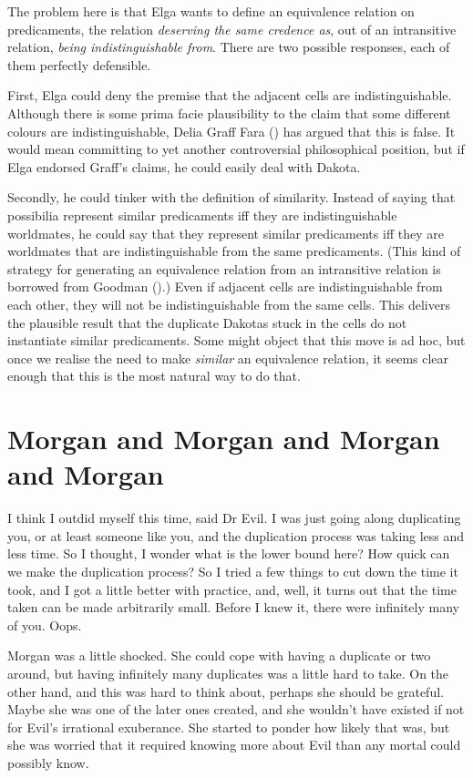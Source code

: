 \documentclass[
  11pt,
  letterpaper,
  DIV=11,
  numbers=noendperiod,
  oneside]{scrartcl}
\begin{document}
The problem here is that Elga wants to define an equivalence relation on
predicaments, the relation \emph{deserving the same credence as}, out of
an intransitive relation, \emph{being indistinguishable from}. There are
two possible responses, each of them perfectly defensible.

First, Elga could deny the premise that the adjacent cells are
indistinguishable. Although there is some prima facie plausibility to
the claim that some different colours are indistinguishable, Delia Graff
Fara () has argued that this is false. It
would mean committing to yet another controversial philosophical
position, but if Elga endorsed Graff's claims, he could easily deal with
Dakota.

Secondly, he could tinker with the definition of similarity. Instead of
saying that possibilia represent similar predicaments iff they are
indistinguishable worldmates, he could say that they represent similar
predicaments iff they are worldmates that are indistinguishable from the
same predicaments. (This kind of strategy for generating an equivalence
relation from an intransitive relation is borrowed from Goodman
().) Even if adjacent cells are
indistinguishable from each other, they will not be indistinguishable
from the same cells. This delivers the plausible result that the
duplicate Dakotas stuck in the cells do not instantiate similar
predicaments. Some might object that this move is ad hoc, but once we
realise the need to make \emph{similar} an equivalence relation, it
seems clear enough that this is the most natural way to do that.

\section{Morgan and Morgan and Morgan and
Morgan}\label{morgan-and-morgan-and-morgan-and-morgan}

I think I outdid myself this time, said Dr Evil. I was just going along
duplicating you, or at least someone like you, and the duplication
process was taking less and less time. So I thought, I wonder what is
the lower bound here? How quick can we make the duplication process? So
I tried a few things to cut down the time it took, and I got a little
better with practice, and, well, it turns out that the time taken can be
made arbitrarily small. Before I knew it, there were infinitely many of
you. Oops.

Morgan was a little shocked. She could cope with having a duplicate or
two around, but having infinitely many duplicates was a little hard to
take. On the other hand, and this was hard to think about, perhaps she
should be grateful. Maybe she was one of the later ones created, and she
wouldn't have existed if not for Evil's irrational exuberance. She
started to ponder how likely that was, but she was worried that it
required knowing more about Evil than any mortal could possibly know.
\end{document}
